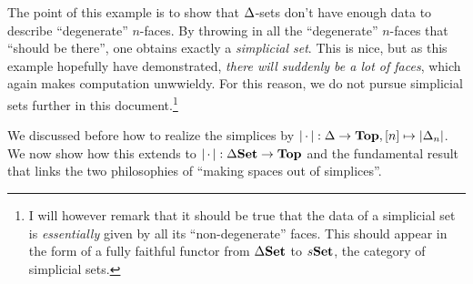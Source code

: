 \documentclass{article}
\begin{document}
\begin{eg}
    The point of this example is to show that 
    $\Delta$-sets don't have enough data to describe ``degenerate'' $n$-faces.
    By throwing in all the ``degenerate'' $n$-faces that ``should be there'',
    one obtains exactly a \emph{simplicial set}.
    This is nice, 
    but as this example hopefully have demonstrated,
    \emph{there will suddenly be a lot of faces},
    which again makes computation unwwieldy. 
    For this reason, we do not pursue simplicial sets further in this 
    document.\footnote{
      I will however remark that 
      it should be true that the data of a simplicial set is
      \emph{essentially} given by all its ``non-degenerate'' faces. 
      This should appear in the form of a 
      fully faithful functor from $\Delta\mathbf{Set}$ to $s\mathbf{Set}$,
      the category of simplicial sets.
    } 
\end{eg}

\begin{rmk}
  We discussed before how to realize 
  the simplices by $\left\vert \,\cdot\, \right\vert : \Delta \to \mathbf{Top}, [n] \mapsto \left\vert \Delta_n \right\vert$.
  We now show how this extends to $\left\vert \,\cdot\, \right\vert : \Delta\mathbf{Set} \to \mathbf{Top}$
  and the fundamental result that links 
  the two philosophies of ``making spaces out of simplices''.
\end{rmk}
\end{document}
